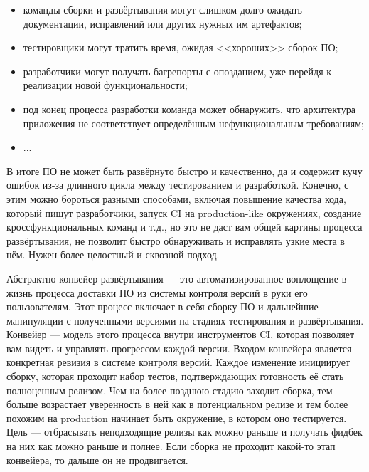 \documentclass{../../text-style}
\begin{document}
\begin{itemize}
    \item команды сборки и развёртывания могут слишком долго ожидать документации, исправлений или других нужных им артефактов;
    \item тестировщики могут тратить время, ожидая <<хороших>> сборок ПО;
    \item разработчики могут получать багрепорты с опозданием, уже перейдя к реализации новой функциональности;
    \item под конец процесса разработки команда может обнаружить, что архитектура приложения не соответствует определённым нефункциональным требованиям;
    \item ...
\end{itemize}

В итоге ПО не может быть развёрнуто быстро и качественно, да и содержит кучу ошибок из-за длинного цикла между тестированием и разработкой. Конечно, с этим можно бороться разными способами, включая повышение качества кода, который пишут разработчики, запуск CI на production-like окружениях, создание кроссфункциональных команд и т.д., но это не даст вам общей картины процесса развёртывания, не позволит быстро обнаруживать и исправлять узкие места в нём. Нужен более целостный и сквозной подход.

Абстрактно конвейер развёртывания --- это автоматизированное воплощение в жизнь процесса доставки ПО из системы контроля версий в руки его пользователям. Этот процесс включает в себя сборку ПО и дальнейшие манипуляции с полученными версиями на стадиях тестирования и развёртывания. Конвейер --- модель этого процесса внутри инструментов CI, которая позволяет вам видеть и управлять прогрессом каждой версии. Входом конвейера является конкретная ревизия в системе контроля версий. Каждое изменение инициирует сборку, которая проходит набор тестов, подтверждающих готовность её стать полноценным релизом. Чем на более позднюю стадию заходит сборка, тем больше возрастает уверенность в ней как в потенциальном релизе и тем более похожим на production начинает быть окружение, в котором оно тестируется. Цель --- отбрасывать неподходящие релизы как можно раньше и получать фидбек на них как можно раньше и полнее. Если сборка не проходит какой-то этап конвейера, то дальше он не продвигается.
\end{document}
